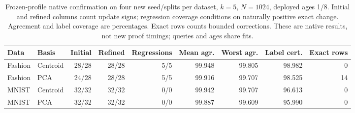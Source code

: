 \begin{table}[tbp]
\centering
\caption{Frozen-profile native confirmation on four new seed/splits per dataset, $k=5$, $N=1024$, deployed ages 1/8. Initial and refined columns count update signs; regression coverage conditions on naturally positive exact change. Agreement and label coverage are percentages. Exact rows counts bounded corrections. These are native results, not new proof timings; queries and ages share fits.}
\label{tab:optimized-confirmation}
\begin{adjustbox}{max width=.98\textwidth,center=\textwidth}
\begin{tabular}{llrrrrrrr}
\toprule
Data & Basis & Initial & Refined & Regressions & Mean agr. & Worst agr. & Label cert. & Exact rows\\
\midrule
Fashion & Centroid & 28/28 & 28/28 & 5/5 & 99.948 & 99.805 & 98.982 & 0\\
Fashion & PCA & 24/28 & 28/28 & 5/5 & 99.916 & 99.707 & 98.525 & 14\\
MNIST & Centroid & 32/32 & 32/32 & 0/0 & 99.942 & 99.707 & 96.613 & 0\\
MNIST & PCA & 32/32 & 32/32 & 0/0 & 99.887 & 99.609 & 95.990 & 0\\
\bottomrule
\end{tabular}
\end{adjustbox}
\end{table}
